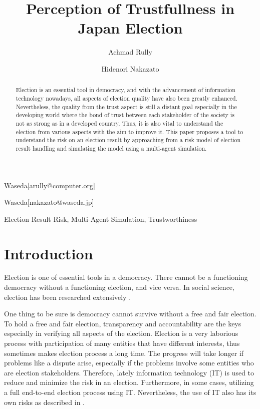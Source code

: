 \documentclass[JIP]{ipsj}
\begin{document}
\title{Perception of Trustfullness in Japan Election}


\author{Achmad Rully}{Waseda}[arully@computer.org]
\author{Hidenori Nakazato}{Waseda}[nakazato@waseda.jp]


\begin{abstract}
Election is an essential tool in democracy, and with the advancement of information technology nowadays, all aspects of election quality have also been greatly enhanced. Nevertheless, the quality from the trust aspect is still a distant goal especially in the developing world where the bond of trust between each stakeholder of the society is not as strong as in a developed country. Thus, it is also vital to understand the election from various aspects with the aim to improve it. This paper proposes a tool to understand the risk on an election result by approaching from a risk model of election result handling and simulating the model using a multi-agent simulation.
\end{abstract}

\begin{keyword}
Election Result Risk, Multi-Agent Simulation, Trustworthiness
\end{keyword}

\maketitle

\section{Introduction}

Election is one of essential tools in a democracy. There cannot be a functioning democracy without a functioning election, and vice versa. In social science, election has been researched extensively \cite{Manan2010}.

One thing to be sure is democracy cannot survive without a free and fair election. To hold a free and fair election, transparency and accountability are the keys especially in verifying all aspects of the election. Election is a very laborious process with participation of many entities that have different interests, thus sometimes makes election process a long time. The progress will take longer if problems like a dispute arise, especially if the problems involve some entities who are election stakeholders. Therefore, lately information technology (IT) is used to reduce and minimize the risk in an election. Furthermore, in some cases, utilizing a full end-to-end election process using IT. Nevertheless, the use of IT also has its own risks as described in \cite{Neumann1995}.
\end{document}
